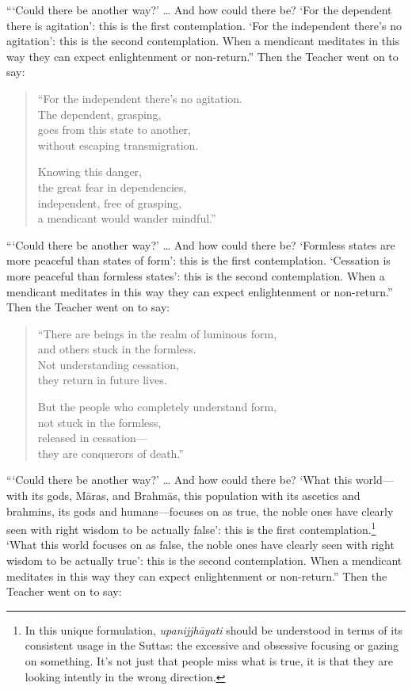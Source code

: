 \documentclass[12pt,openany]{book}%
\begin{document}
“‘Could there be another way?’ … And how could there be? ‘For the dependent there is agitation’: this is the first contemplation. ‘For the independent there’s no agitation’: this is the second contemplation. When a mendicant meditates in this way they can expect enlightenment or non-return.” Then the Teacher went on to say: 

\begin{verse}%
“For the independent there’s no agitation. \\
The dependent, grasping, \\
goes from this state to another, \\
without escaping transmigration. 

Knowing this danger, \\
the great fear in dependencies, \\
independent, free of grasping, \\
a mendicant would wander mindful.” 

%
\end{verse}

“‘Could there be another way?’ … And how could there be? ‘Formless states are more peaceful than states of form’: this is the first contemplation. ‘Cessation is more peaceful than formless states’: this is the second contemplation. When a mendicant meditates in this way they can expect enlightenment or non-return.” Then the Teacher went on to say: 

\begin{verse}%
“There are beings in the realm of luminous form, \\
and others stuck in the formless. \\
Not understanding cessation, \\
they return in future lives. 

But the people who completely understand form, \\
not stuck in the formless, \\
released in cessation—\\
they are conquerors of death.” 

%
\end{verse}

“‘Could there be another way?’ … And how could there be? ‘What this world—with its gods, \textsanskrit{Māras}, and \textsanskrit{Brahmās}, this population with its ascetics and brahmins, its gods and humans—focuses on as true, the noble ones have clearly seen with right wisdom to be actually false’: this is the first contemplation.\footnote{In this unique formulation, \textit{\textsanskrit{upanijjhāyati}} should be understood in terms of its consistent usage in the Suttas: the excessive and obsessive focusing or gazing on something. It’s not just that people miss what is true, it is that they are looking intently in the wrong direction. } ‘What this world focuses on as false, the noble ones have clearly seen with right wisdom to be actually true’: this is the second contemplation. When a mendicant meditates in this way they can expect enlightenment or non-return.” Then the Teacher went on to say: 
\end{document}
